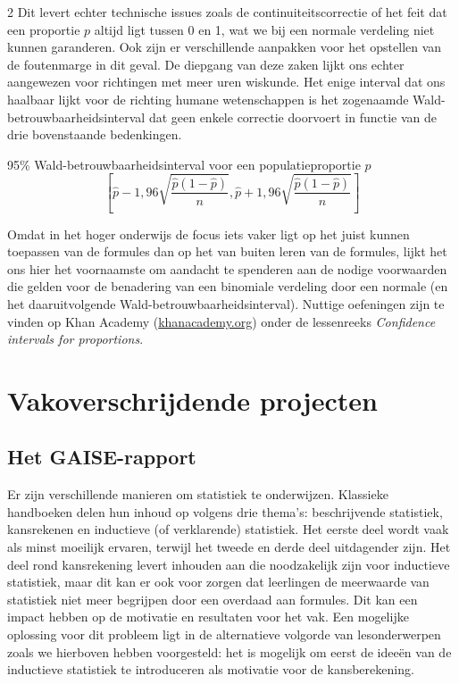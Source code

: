 \begin{multicols}{2}
Dit levert echter technische issues zoals de continu\-iteitscorrectie of het feit dat een proportie $p$ altijd ligt tussen 0 en 1, wat we bij een normale verdeling niet kunnen garanderen. Ook zijn er verschillende aanpakken voor het opstellen van de foutenmarge in dit geval. De diepgang van deze zaken lijkt ons echter aangewezen voor richtingen met meer uren wiskunde. Het enige interval dat ons haalbaar lijkt voor de richting humane wetenschappen is het zogenaamde Wald-betrouwbaarheidsinterval dat geen enkele correctie doorvoert in functie van de drie bovenstaande bedenkingen. 

    \begin{kader}{}{95\% Wald-betrouwbaarheidsinterval voor een populatieproportie $p$}
           \[  \left[ \hat{p} - 1,96 \sqrt{\frac{\hat{p}\left( 1- \hat{p}\right)}{n}}, \hat{p} + 1,96 \sqrt{\frac{\hat{p}\left( 1- \hat{p}\right)}{n}}\right] \]
    \end{kader}

Omdat in het hoger onderwijs de focus iets vaker ligt op het juist kunnen toepassen van de formules dan op het van buiten leren van de formules, lijkt het ons hier het voornaamste om aandacht te spenderen aan de nodige voorwaarden die gelden voor de benadering van een binomiale verdeling door een normale (en het daaruitvolgende Wald-betrouwbaarheidsinterval). Nuttige oefeningen zijn te vinden op Khan Academy (\url{khanacademy.org}) onder de lessenreeks \emph{Confidence intervals for proportions}. 

	
\section{Vakoverschrijdende projecten} \label{S_6}



\subsection*{Het GAISE-rapport}
    
    Er zijn verschillende manieren om statistiek te onderwijzen. Klassieke handboeken delen hun inhoud op volgens drie thema's: beschrijvende statistiek, kansrekenen en inductieve (of verklarende) statistiek. Het eerste deel wordt vaak als minst moeilijk ervaren, terwijl het tweede en derde deel uitdagender zijn. Het deel rond kansrekening levert inhouden aan die noodzakelijk zijn voor inductieve statistiek, maar dit kan er ook voor zorgen dat leerlingen de meerwaarde van statistiek niet meer begrijpen door een overdaad aan formules. Dit kan een impact hebben op de motivatie en resultaten voor het vak. Een mogelijke oplossing voor dit probleem ligt in de alternatieve volgorde van lesonderwerpen zoals we hierboven hebben voorgesteld: het is mogelijk om eerst de idee\"en van de inductieve statistiek te introduceren als motivatie voor de kansberekening.
    

\end{multicols}
